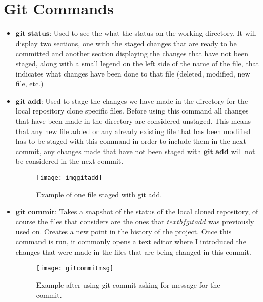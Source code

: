 \documentclass{book}
\begin{document}
\newpage
\appendix
\section{\\ Git Commands} \label{app:gitA}

\begin{itemize}
	\item $\textbf{git status:}$ Used to see the what the status on the working directory. It will display two sections, one with the staged changes that are ready to be committed and another section displaying the changes that have not been staged, along with a small legend on the left side of the name of the file, that indicates what changes have been done to that file (deleted, modified, new file, etc.)

	\item $\textbf{git add:}$ Used to stage the changes we have made in the directory for the local repository clone specific files. Before using this command all changes that have been made in the directory are considered unstaged. This means that any new file added or any already existing file that has been modified has to be staged with this command in order to include them in the next commit, any changes made that have not been staged with $\textbf{git add}$ will not be considered in the next commit.

\begin{figure}[H]
\begin{center}
	\texttt{[image: imggitadd]}

\caption{Example of one file staged with git add.}
\label{fig:imggitadd}
\end{center}
\end{figure}

	\item $\textbf{git commit:}$ Takes a snapshot of the status of the local cloned repository, of course the files that considers are the ones that $textbf{git add}$ was previously used on. Creates a new point in the history of the project. Once this command is run, it commonly opens a text editor where I introduced the changes that were made in the files that are being changed in this commit.
\begin{figure}[H]
\begin{center}
	\texttt{[image: gitcommitmsg]}

\caption{Example after using git commit asking for message for the commit.}
\label{fig:imggitcommit}
\end{center}
\end{figure}


\end{itemize}
\end{document}
